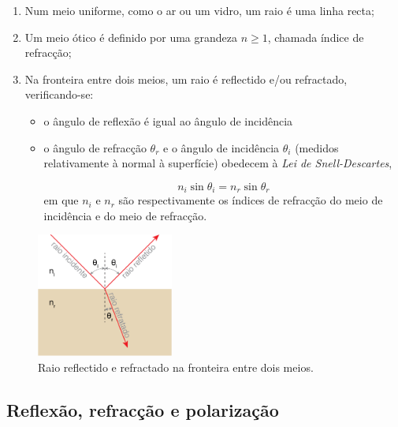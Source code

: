 \documentclass[12pt,a4paper,oneside]{paper}
\begin{document}
\begin{enumerate}
\item Num meio uniforme, como o ar ou um vidro, um raio é uma linha recta;
\item Um meio ótico é definido por uma grandeza $n\geq1$, chamada índice de refracção;
\item Na fronteira entre dois meios, um raio é reflectido e/ou refractado, verificando-se:
\begin{itemize}
\item o ângulo de reflexão é igual ao ângulo de incidência
\item o ângulo de refracção $\theta_r$ e o ângulo de incidência $\theta_i$ (medidos relativamente à normal à superfície)
obedecem à \emph{Lei de Snell-Descartes},

\begin{equation}
n_i\sin{\theta_i}=n_r\sin{\theta_r}
\end{equation}
em que $n_i$ e $n_r$ são respectivamente os índices de refracção do meio de incidência e do meio de refracção.
\end{itemize}
\end{enumerate}
\begin{figure}[H]
\begin{center}
	\includegraphics[width=0.4\textwidth]{./otica_images/1-snell}
	\caption{Raio reflectido e refractado na fronteira entre dois meios.}
	 \label{fig:snell}
\end{center}
\end{figure}

\subsection{\sf Reflexão, refracção e polarização}
\end{document}
